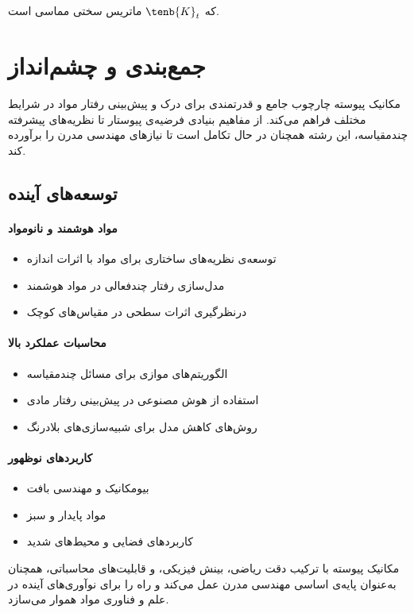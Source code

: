 که $\tenb{K}_t$ ماتریس سختی مماسی است.

\section{جمع‌بندی و چشم‌انداز}

مکانیک پیوسته چارچوب جامع و قدرتمندی برای درک و پیش‌بینی رفتار مواد در شرایط مختلف فراهم می‌کند. از مفاهیم بنیادی فرضیه‌ی پیوستار تا نظریه‌های پیشرفته چندمقیاسه، این رشته همچنان در حال تکامل است تا نیازهای مهندسی مدرن را برآورده کند.

\subsection{توسعه‌های آینده}

\paragraph{مواد هوشمند و نانومواد}
\begin{itemize}
	\item توسعه‌ی نظریه‌های ساختاری برای مواد با اثرات اندازه
	\item مدل‌سازی رفتار چندفعالی در مواد هوشمند
	\item درنظرگیری اثرات سطحی در مقیاس‌های کوچک
\end{itemize}

\paragraph{محاسبات عملکرد بالا}
\begin{itemize}
	\item الگوریتم‌های موازی برای مسائل چندمقیاسه
	\item استفاده از هوش مصنوعی در پیش‌بینی رفتار مادی
	\item روش‌های کاهش مدل برای شبیه‌سازی‌های بلادرنگ
\end{itemize}

\paragraph{کاربردهای نوظهور}
\begin{itemize}
	\item بیومکانیک و مهندسی بافت
	\item مواد پایدار و سبز
	\item کاربردهای فضایی و محیط‌های شدید
\end{itemize}

مکانیک پیوسته با ترکیب دقت ریاضی، بینش فیزیکی، و قابلیت‌های محاسباتی، همچنان به‌عنوان پایه‌ی اساسی مهندسی مدرن عمل می‌کند و راه را برای نوآوری‌های آینده در علم و فناوری مواد هموار می‌سازد.